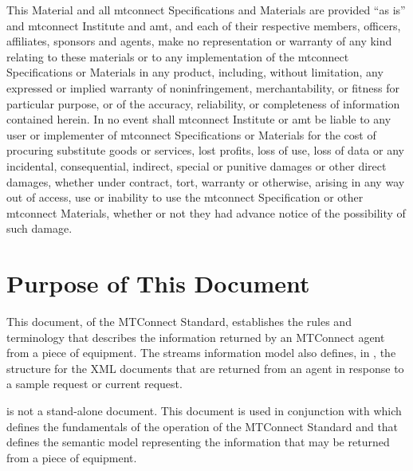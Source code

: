 \documentclass{mtconnect}	%
\begin{document}
\begin{nolinenumbers}
This Material and all \gls{mtconnect} Specifications and Materials are provided ``as is'' and \gls{mtconnect} Institute and \gls{amt}, and each of their respective members, officers, affiliates, sponsors and agents, make no representation or warranty of any kind relating to these materials or to any implementation of the \gls{mtconnect} Specifications or Materials in any product, including, without limitation, any expressed or implied warranty of noninfringement, merchantability, or fitness for particular purpose, or of the accuracy, reliability, or completeness of information contained herein. In no event shall \gls{mtconnect} Institute or \gls{amt} be liable to any user or implementer of \gls{mtconnect} Specifications or Materials for the cost of procuring substitute goods or services, lost profits, loss of use, loss of data or any incidental, consequential, indirect, special or punitive damages or other direct damages, whether under contract, tort, warranty or otherwise, arising in any way out of access, use or inability to use the \gls{mtconnect} Specification or other \gls{mtconnect} Materials, whether or not they had advance notice of the possibility of such damage.


\clearpage
\tableofcontents
\thispagestyle{fancy}
\clearpage
\listoffigures
\thispagestyle{fancy}
\clearpage
\listoftables
\end{nolinenumbers}



\section{Purpose of This Document}

This document,  of the MTConnect  Standard, establishes the rules and terminology that describes the information returned by an MTConnect \gls{agent} from a piece of equipment.  The \gls{streams information model} also defines, in , the structure for the XML documents that are returned from an \gls{agent} in response to a \gls{sample request} or \gls{current request}.  

 is not a stand-alone document.   This document is used in conjunction with   which defines the fundamentals of the operation of the MTConnect Standard and  that defines the semantic model representing the information that may be returned from a piece of equipment.
\end{document}
